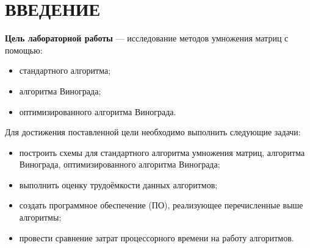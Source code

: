 \chapter*{ВВЕДЕНИЕ}

\textbf{Цель лабораторной работы} --- исследование методов умножения матриц с помощью:

\begin{itemize}[label=--]
    \item стандартного алгоритма;
    \item алгоритма Винограда;
    \item оптимизированного алгоритма Винограда.
\end{itemize}

Для достижения поставленной цели необходимо выполнить следующие задачи:

\begin{itemize}[label=--]
\item построить схемы для стандартного алгоритма умножения матриц, алгоритма Винограда, оптимизированного алгоритма Винограда;
\item выполнить оценку трудоёмкости данных алгоритмов;
\item создать программное обеспечение (ПО), реализующее перечисленные выше алгоритмы;
\item провести сравнение затрат процессорного времени на работу алгоритмов.
\end{itemize}

